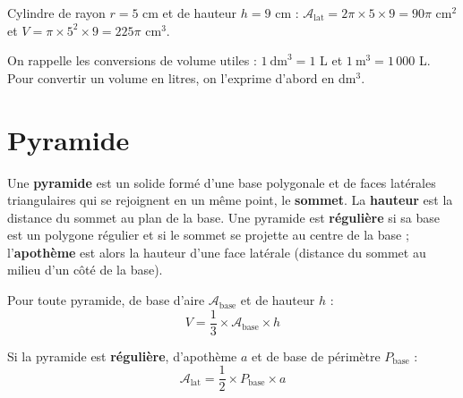 \begin{exemple}
Cylindre de rayon $r=5$ cm et de hauteur $h=9$ cm : $\mathcal{A}_{\text{lat}}=2\pi\times5\times9=90\pi$ cm$^{2}$
et $V=\pi\times5^{2}\times9=225\pi$ cm$^{3}$.
\end{exemple}

\begin{remarque}
On rappelle les conversions de volume utiles : $1\ \text{dm}^{3}=1$ L et
$1\ \text{m}^{3}=1\,000$ L. Pour convertir un volume en litres, on l'exprime d'abord en
dm$^{3}$.
\end{remarque}

\section{Pyramide}

\begin{definition}[Pyramide]
Une \textbf{pyramide} est un solide formé d'une base polygonale et de faces latérales
triangulaires qui se rejoignent en un même point, le \textbf{sommet}. La \textbf{hauteur}
est la distance du sommet au plan de la base. Une pyramide est \textbf{régulière} si sa base
est un polygone régulier et si le sommet se projette au centre de la base ; l'\textbf{apothème}
est alors la hauteur d'une face latérale (distance du sommet au milieu d'un côté de la base).
\end{definition}

\begin{propriete}
Pour toute pyramide, de base d'aire $\mathcal{A}_{\text{base}}$ et de hauteur $h$ :
\[
V=\frac{1}{3}\times\mathcal{A}_{\text{base}}\times h
\]
\end{propriete}

\begin{propriete}
Si la pyramide est \textbf{régulière}, d'apothème $a$ et de base de périmètre $P_{\text{base}}$ :
\[
\mathcal{A}_{\text{lat}}=\frac{1}{2}\times P_{\text{base}}\times a
\]
\end{propriete}

\begin{illus}
\end{illus}

